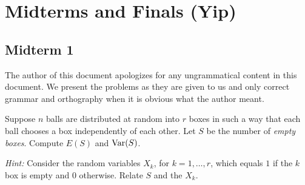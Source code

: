 \section{Midterms and Finals (Yip)}
\subsection{Midterm 1}
The author of this document apologizes for any ungrammatical content in
this document. We present the problems as they are given to us and only
correct grammar and orthography when it is obvious what the author meant.
\begin{problem}
  Suppose \(n\) balls are distributed at random into \(r\) boxes in such a
  way that each ball chooses a box independently of each other. Let \(S\)
  be the number of \emph{empty boxes}. Compute \(E(S)\) and \(\operatorname{Var}(S)\).

  \noindent\emph{Hint:} Consider the random variables \(X_k\), for
  \(k=1,\dotsc,r\), which equals \(1\) if the \(k\) box is
  empty and \(0\) otherwise. Relate \(S\) and the \(X_k\).
\end{problem}
